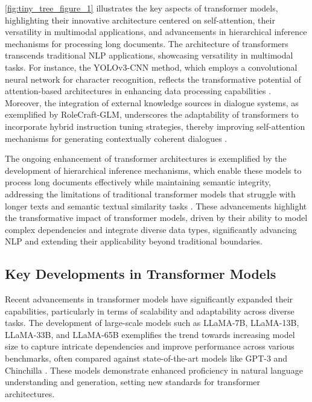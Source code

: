 \autoref{fig:tiny_tree_figure_1} illustrates the key aspects of transformer models, highlighting their innovative architecture centered on self-attention, their versatility in multimodal applications, and advancements in hierarchical inference mechanisms for processing long documents. The architecture of transformers transcends traditional NLP applications, showcasing versatility in multimodal tasks. For instance, the YOLOv3-CNN method, which employs a convolutional neural network for character recognition, reflects the transformative potential of attention-based architectures in enhancing data processing capabilities \cite{adak2022automaticnumberplaterecognition}. Moreover, the integration of external knowledge sources in dialogue systems, as exemplified by RoleCraft-GLM, underscores the adaptability of transformers to incorporate hybrid instruction tuning strategies, thereby improving self-attention mechanisms for generating contextually coherent dialogues \cite{lin2023interpretabilityframeworksimilarcase}.

The ongoing enhancement of transformer architectures is exemplified by the development of hierarchical inference mechanisms, which enable these models to process long documents effectively while maintaining semantic integrity, addressing the limitations of traditional transformer models that struggle with longer texts and semantic textual similarity tasks \cite{ginzburg2021selfsuperviseddocumentsimilarityranking}. These advancements highlight the transformative impact of transformer models, driven by their ability to model complex dependencies and integrate diverse data types, significantly advancing NLP and extending their applicability beyond traditional boundaries.


\subsection{Key Developments in Transformer Models} \label{subsec:Key Developments in Transformer Models}

Recent advancements in transformer models have significantly expanded their capabilities, particularly in terms of scalability and adaptability across diverse tasks. The development of large-scale models such as LLaMA-7B, LLaMA-13B, LLaMA-33B, and LLaMA-65B exemplifies the trend towards increasing model size to capture intricate dependencies and improve performance across various benchmarks, often compared against state-of-the-art models like GPT-3 and Chinchilla \cite{touvron2023llama}. These models demonstrate enhanced proficiency in natural language understanding and generation, setting new standards for transformer architectures.



